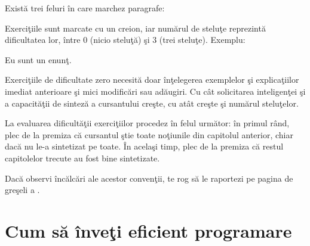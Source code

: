 Există trei feluri în care marchez paragrafe:




Exerciţiile sunt marcate cu un creion, iar numărul de steluţe reprezintă dificultatea lor, între 0 (nicio steluţă)
şi 3 (trei steluţe). Exemplu:
\begin{Exercise*}[title={Exerciţiu de dificultate 1},difficulty=1]
	Eu sunt un enunţ.
\end{Exercise*}

Exerciţiile de dificultate zero necesită doar înţelegerea exemplelor şi
explicaţiilor imediat anterioare şi mici modificări sau adăugiri.
Cu cât solicitarea inteligenţei şi a capacităţii de sinteză a cursantului
creşte, cu atât creşte şi numărul steluţelor.

La evaluarea dificultăţii exerciţiilor procedez în
felul următor: în primul rând, plec de la premiza că
cursantul ştie toate noţiunile din capitolul anterior,
chiar dacă nu le-a sintetizat pe toate. În acelaşi timp,
plec de la premiza că restul capitolelor trecute
au fost bine sintetizate.



Dacă observi încălcări ale acestor convenţii, te rog să le
raportezi pe pagina de greşeli a \phpro.
{}
\section*{Cum să înveţi eficient programare}

